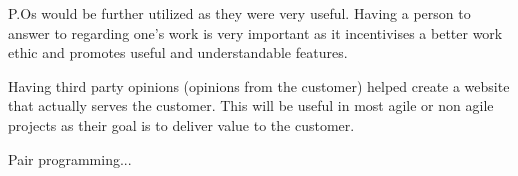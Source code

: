P.Os would be further utilized as they were very useful. Having a person to answer to regarding one's work is very important as it incentivises a better work ethic and promotes useful and understandable features.

Having third party opinions (opinions from the customer) helped create a website that actually serves the customer. This will be useful in most agile or non agile projects as their goal is to deliver value to the customer.

Pair programming...



